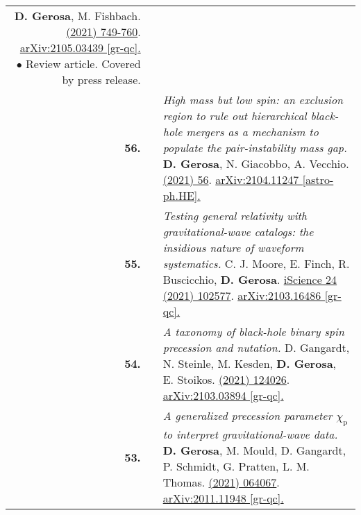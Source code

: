 {\begin{longtable}{rp{0.3cm}p{15.8cm}}
\newline{}
\textbf{D. Gerosa}, M. Fishbach.
\newline{}
\href{https://www.nature.com/articles/s41550-021-01398-w}{\natastro 5 (2021) 749-760}. \href{https://arxiv.org/abs/2105.03439}{arXiv:2105.03439 [gr-qc].}
\newline{}
\textcolor{color1}{$\bullet$} Review article. Covered by press release.
\vspace{0.09cm}\\
%
\textbf{56.} & & \textit{High mass but low spin: an exclusion region to rule out hierarchical black-hole mergers as a mechanism to populate the pair-instability mass gap.}
\newline{}
\textbf{D. Gerosa}, N. Giacobbo, A. Vecchio.
\newline{}
\href{https://iopscience.iop.org/article/10.3847/1538-4357/ac00bb}{\apj 915 (2021) 56}. \href{https://arxiv.org/abs/2104.11247}{arXiv:2104.11247   [astro-ph.HE].}
\vspace{0.09cm}\\
%
\textbf{55.} & & \textit{Testing general relativity with gravitational-wave catalogs: the insidious nature of waveform systematics.}
\newline{}
C. J. Moore, E. Finch, R. Buscicchio, \textbf{D. Gerosa}.
\newline{}
\href{https://www.sciencedirect.com/science/article/pii/S2589004221005459}{iScience 24 (2021) 102577}. \href{https://arxiv.org/abs/2103.16486}{arXiv:2103.16486   [gr-qc].}
\vspace{0.09cm}\\
%
\textbf{54.} & & \textit{A taxonomy of black-hole binary spin precession and nutation.}
\newline{}
D. Gangardt, N. Steinle, M. Kesden, \textbf{D. Gerosa}, E. Stoikos.
\newline{}
\href{https://journals.aps.org/prd/abstract/10.1103/PhysRevD.103.124026}{\prd 103 (2021) 124026}. \href{https://arxiv.org/abs/2103.03894}{arXiv:2103.03894 [gr-qc].}
\vspace{0.09cm}\\
%
\textbf{53.} & & \textit{A generalized precession parameter $\chi_\mathrm{p}$ to interpret gravitational-wave data.}
\newline{}
\textbf{D. Gerosa}, M. Mould, D. Gangardt, P. Schmidt, G. Pratten, L. M. Thomas.
\newline{}
\href{https://journals.aps.org/prd/abstract/10.1103/PhysRevD.103.064067}{\prd 103 (2021) 064067}. \href{https://arxiv.org/abs/2011.11948}{arXiv:2011.11948 [gr-qc].}

\end{longtable}}
